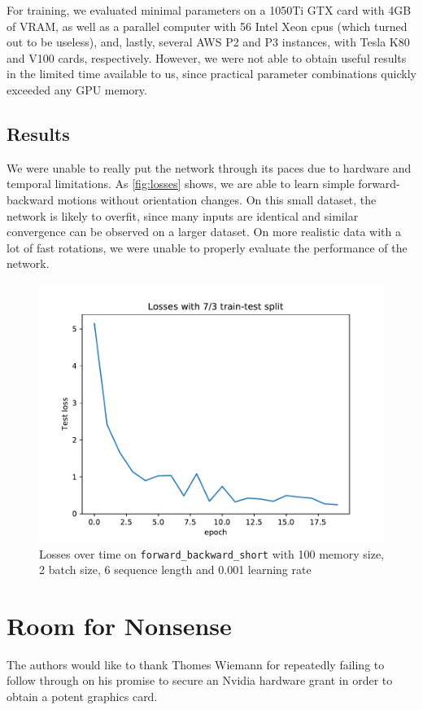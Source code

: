 \documentclass[a4paper,11pt]{article}
\begin{document}
For training, we evaluated minimal parameters on a 1050Ti GTX card with 4GB of
VRAM, as well as a parallel computer with 56 Intel Xeon cpus (which turned out
to be useless), and, lastly, several AWS P2 and P3 instances, with Tesla K80 and
V100 cards, respectively. However, we were not able to obtain useful results in
the limited time available to us, since practical parameter combinations quickly
exceeded any GPU memory.


\subsection{Results}
\label{sec:evaluation:results}

We were unable to really put the network through its paces due to hardware and
temporal limitations. As \autoref{fig:losses} shows, we are able to learn simple
forward-backward motions without orientation changes. On this small dataset, the
network is likely to overfit, since many inputs are identical and similar convergence can be
observed on a larger dataset. On more realistic data with a lot of fast
rotations, we were unable to properly evaluate the performance of the network.

\begin{figure}
    \centering
    \includegraphics[width=0.8\linewidth]{losses.pdf}
    \caption{Losses over time on \texttt{forward\_backward\_short} with 100
    memory size, 2 batch size, 6 sequence length and 0.001 learning rate}
    \label{fig:losses}
\end{figure}

\section{Room for Nonsense}
\label{sec:nonsense}
The authors would like to thank Thomes Wiemann for repeatedly failing to follow
through on his promise to secure an Nvidia hardware grant in order to obtain a
potent graphics card.


\newpage
\printbibliography
\end{document}
